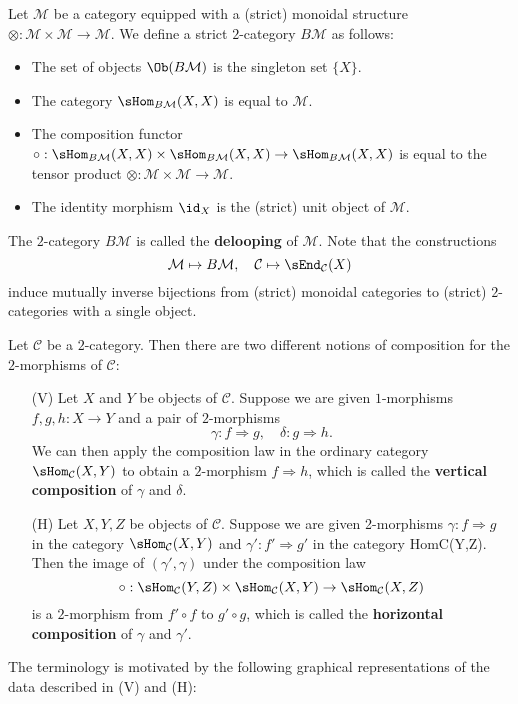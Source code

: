 \begin{example}\label{2-cat delooping of monoidal cat}
Let $\mathcal{M}$ be a category equipped with a (strict) monoidal structure $\otimes:\mathcal{M}\times\mathcal{M}\to\mathcal{M}$. We define a strict $2$-category $B\mathcal{M}$ as follows:
\begin{itemize}
\item The set of objects $\Ob(B\mathcal{M})$ is the singleton set $\{X\}$.
\item The category $\sHom_{B\mathcal{M}}(X,X)$ is equal to $\mathcal{M}$.
\item The composition functor $\circ:\sHom_{B\mathcal{M}}(X,X)\times\sHom_{B\mathcal{M}}(X,X)\to\sHom_{B\mathcal{M}}(X,X)$ is equal to the tensor product $\otimes:\mathcal{M}\times\mathcal{M}\to\mathcal{M}$.
\item The identity morphism $\id_X$ is the (strict) unit object of $\mathcal{M}$.
\end{itemize}
The $2$-category $B\mathcal{M}$ is called the \textbf{delooping} of $\mathcal{M}$. Note that the constructions
\[\mathcal{M}\mapsto B\mathcal{M},\quad \mathcal{C}\mapsto\sEnd_{\mathcal{C}}(X)\]
induce mutually inverse bijections from (strict) monoidal categories to (strict) $2$-categories with a single object.
\end{example}
Let $\mathcal{C}$ be a $2$-category. Then there are two different notions of composition for the $2$-morphisms of $\mathcal{C}$:
\begin{itemize}
\item[(V)] Let $X$ and $Y$ be objects of $\mathcal{C}$. Suppose we are given $1$-morphisms $f,g,h:X\to Y$ and a pair of $2$-morphisms
\[\gamma:f\Rightarrow g,\quad \delta:g\Rightarrow h.\]
We can then apply the composition law in the ordinary category $\sHom_{\mathcal{C}}(X,Y)$ to obtain a $2$-morphism $f\Rightarrow h$, which is called the \textbf{vertical composition} of $\gamma$ and $\delta$.
\item[(H)] Let $X,Y,Z$ be objects of $\mathcal{C}$. Suppose we are given 2-morphisms $\gamma:f\Rightarrow g$ in the category $\sHom_{\mathcal{C}}(X,Y)$ and $\gamma':f'\Rightarrow g'$ in the category HomC(Y,Z). Then the image of $(\gamma',\gamma)$ under the composition law
\[\circ:\sHom_{\mathcal{C}}(Y,Z)\times\sHom_{\mathcal{C}}(X,Y)\to\sHom_{\mathcal{C}}(X,Z)\]
is a $2$-morphism from $f'\circ f$ to $g'\circ g$, which is called the \textbf{horizontal composition} of $\gamma$ and $\gamma'$.
\end{itemize}
The terminology is motivated by the following graphical representations of the data described in (V) and (H):
